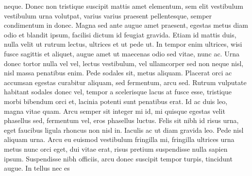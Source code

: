 \begin{remark}
 neque. Donec non tristique suscipit mattis amet elementum, sem elit vestibulum
 vestibulum urna volutpat, varius varius praesent pellentesque, semper
 condimentum in donec. Magna sed ante augue amet praesent, egestas metus diam
 odio et blandit ipsum, facilisi dictum id feugiat gravida. Etiam id mattis
 duis, nulla velit ut rutrum lectus, ultrices et ut pede ut.
 In tempor enim ultrices, wisi fusce sagittis et aliquet, augue amet ut
 maecenas odio sed vitae, nunc ac. Urna donec tortor nulla vel vel, lectus
 vestibulum, vel ullamcorper sed non neque nisl, nisl massa penatibus enim.
 Pede sodales sit, metus aliquam. Placerat orci ac accumsan egestas curabitur
 aliquam, sed fermentum, arcu sed. Rutrum vulputate habitant sodales donec vel,
 tempor a scelerisque lacus at fusce esse, tristique morbi bibendum orci et,
 lacinia potenti sunt penatibus erat. Id ac duis leo, magna vitae quam. Arcu
 semper sit integer mi id, mi quisque egestas velit phasellus sed, fermentum
 vel, eros phasellus luctus. Felis sit nibh id risus urna, eget faucibus ligula
 rhoncus non nisl in. Iaculis ac ut diam gravida leo. Pede nisl aliquam urna.
 Arcu eu euismod vestibulum fringilla mi, fringilla ultrices urna metus nunc
 orci eget, dui vitae erat, risus pretium suspendisse nulla sapien ipsum.
 Suspendisse nibh officiis, arcu donec suscipit tempor turpis, tincidunt augue.
 In tellus nec es
 \end{remark}
